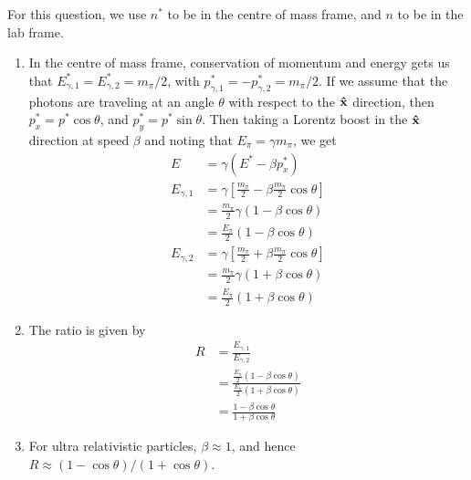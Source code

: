 For this question, we use $n^*$ to be in the centre of mass frame, and $n$ to be in the lab frame.

\begin{enumerate}
	\item In the centre of mass frame, conservation of momentum and energy gets us that $E^*_{\gamma,1} = E^*_{\gamma,2} = m_\pi/2$, with $p^*_{\gamma,1} = -p^*_{\gamma,2} = m_\pi/2$. If we assume that the photons are traveling at an angle $\theta$ with respect to the $\mathbf{\hat{x}}$ direction, then $p^*_x = p^*\cos\theta$, and $p^*_y = p^*\sin\theta$. Then taking a Lorentz boost in the $\mathbf{\hat{x}}$ direction at speed $\beta$ and noting that $E_\pi = \gamma m_\pi$, we get
	\begin{align*}
		E &= \gamma(E^* - \beta p_x^*)\\
		E_{\gamma,1} &= \gamma\left[ \frac{m_\pi}{2} - \beta \frac{m_\pi}{2}\cos\theta\right]\\
			&= \frac{m_\pi}{2}\gamma(1-\beta\cos\theta)\\
			&= \frac{E_\pi}{2}(1-\beta\cos\theta)\\
		E_{\gamma,2} &= \gamma\left[ \frac{m_\pi}{2} + \beta \frac{m_\pi}{2}\cos\theta\right]\\
			&= \frac{m_\pi}{2}\gamma(1+\beta\cos\theta)\\
			&= \frac{E_\pi}{2}(1+\beta\cos\theta)
	\end{align*}
	\item The ratio is given by
	\begin{align*}
		R &= \frac{E_{\gamma,1}}{E_{\gamma,2}} \\
			&= \frac{\frac{E_\pi}{2}(1-\beta\cos\theta)}{\frac{E_\pi}{2}(1+\beta\cos\theta)}\\
			&= \frac{1-\beta\cos\theta}{1+\beta\cos\theta}
	\end{align*}
	\item For ultra relativistic particles, $\beta \approx 1$, and hence $R \approx (1-\cos\theta)/(1+\cos\theta)$.
\end{enumerate}
